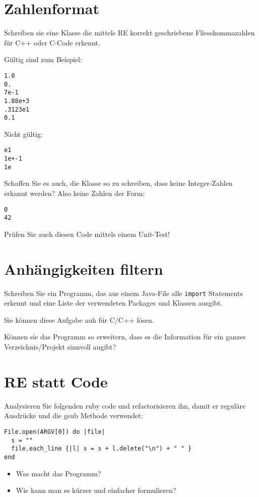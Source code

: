 \documentclass[a4paper,11pt,oneside]{scrbook}
\begin{document}
\section{Zahlenformat} %
\label{sec:zahlenformat}
Schreiben sie eine Klasse die mittels RE korrekt geschriebene Fliesskommazahlen für C++ oder C-Code erkennt.

Gültig sind zum Beispiel:
\begin{lstlisting}
1.0
0.
7e-1
1.88e+3
.3123e1
0.1
\end{lstlisting}

Nicht gültig:
\begin{lstlisting}
e1
1e+-1
1e
\end{lstlisting}

Schaffen Sie es auch, die Klasse so zu schreiben, dass keine Integer-Zahlen erkannt werden? Also keine Zahlen der Form:
\begin{lstlisting}
0
42
\end{lstlisting}

Prüfen Sie auch diesen Code mittels einem Unit-Test!


\section{Anhängigkeiten filtern} %
\label{sec:anhängigkeiten_filtern}
Schreiben Sie ein Programm, das aus einem Java-File alle \texttt{import} Statements erkennt und eine Liste der verwendeten Packages und Klassen ausgibt.

Sie können diese Aufgabe auh für C/C++ lösen.

Können sie das Programm so erweitern, dass es die Information für ein ganzes Verzeichnis/Projekt sinnvoll augibt?


\section{RE statt Code} %
\label{sec:re_statt_code}
Analysieren Sie folgenden ruby code und refactorisieren ihn, damit er reguläre Ausdrücke und die gsub Methode verwendet:

\begin{lstlisting}
File.open(ARGV[0]) do |file|
  s = ""
  file.each_line {|l| s = s + l.delete("\n") + " " } 
end
\end{lstlisting}

\begin{itemize}
	\item Was macht das Programm?
	\item Wie kann man es kürzer und einfacher formulieren?
\end{itemize}
\end{document}
